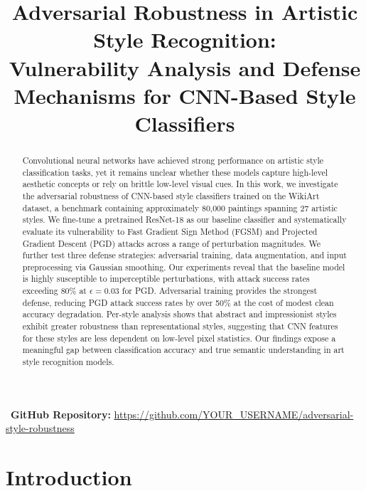 \documentclass[conference]{IEEEtran}
\title{Adversarial Robustness in Artistic Style Recognition: \\
Vulnerability Analysis and Defense Mechanisms for CNN-Based Style Classifiers}
\author{
    \IEEEauthorblockN{Deepak Kulkarni}
    \IEEEauthorblockA{
        \textit{Brown University} \\
        email2@brown.edu
    }
    \and
    \IEEEauthorblockN{Qiuli Lai}
    \IEEEauthorblockA{
        \textit{Brown University} \\
        qiuli\_lai@brown.edu
    }
}
\begin{document}
\maketitle

\begin{abstract}
Convolutional neural networks have achieved strong performance on artistic style classification tasks, yet it remains unclear whether these models capture high-level aesthetic concepts or rely on brittle low-level visual cues. In this work, we investigate the adversarial robustness of CNN-based style classifiers trained on the WikiArt dataset, a benchmark containing approximately 80,000 paintings spanning 27 artistic styles. We fine-tune a pretrained ResNet-18 as our baseline classifier and systematically evaluate its vulnerability to Fast Gradient Sign Method (FGSM) and Projected Gradient Descent (PGD) attacks across a range of perturbation magnitudes. We further test three defense strategies: adversarial training, data augmentation, and input preprocessing via Gaussian smoothing. Our experiments reveal that the baseline model is highly susceptible to imperceptible perturbations, with attack success rates exceeding 80\% at $\epsilon=0.03$ for PGD. Adversarial training provides the strongest defense, reducing PGD attack success rates by over 50\% at the cost of modest clean accuracy degradation. Per-style analysis shows that abstract and impressionist styles exhibit greater robustness than representational styles, suggesting that CNN features for these styles are less dependent on low-level pixel statistics. Our findings expose a meaningful gap between classification accuracy and true semantic understanding in art style recognition models.
\end{abstract}

\begin{center}
    \faGithub\ \textbf{GitHub Repository:} \url{https://github.com/YOUR_USERNAME/adversarial-style-robustness}
\end{center}
\vspace{0.2cm}

\section{Introduction}
\end{document}
